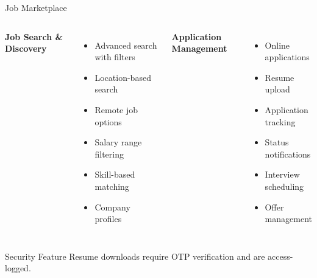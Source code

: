 \documentclass[aspectratio=169]{beamer}
\begin{document}
\begin{frame}{Job Marketplace}
\begin{columns}
\textbf{Job Search \& Discovery}
\begin{itemize}
    \item Advanced search with filters
    \item Location-based search
    \item Remote job options
    \item Salary range filtering
    \item Skill-based matching
    \item Company profiles
\end{itemize}

\textbf{Application Management}
\begin{itemize}
    \item Online applications
    \item Resume upload
    \item Application tracking
    \item Status notifications
    \item Interview scheduling
    \item Offer management
\end{itemize}
\end{columns}

\vspace{0.3cm}
\begin{block}{Security Feature}
Resume downloads require OTP verification and are access-logged.
\end{block}
\end{frame}
\end{document}
